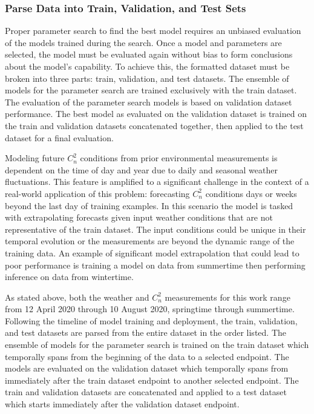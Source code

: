 \subsubsection{Parse Data into Train, Validation, and Test Sets}
Proper parameter search to find the best model requires an unbiased evaluation of the models trained during the search. Once a model and parameters are selected, the model must be evaluated again without bias to form conclusions about the model's capability. To achieve this, the formatted dataset must be broken into three parts: train, validation, and test datasets. The ensemble of models for the parameter search are trained exclusively with the train dataset. The evaluation of the parameter search models is based on validation dataset performance. The best model as evaluated on the validation dataset is trained on the train and validation datasets concatenated together, then applied to the test dataset for a final evaluation.

Modeling future $C_{n}^{2}$ conditions from prior environmental measurements is dependent on the time of day and year due to daily and seasonal weather fluctuations. This feature is amplified to a significant challenge in the context of a real-world application of this problem: forecasting $C_{n}^{2}$ conditions days or weeks beyond the last day of training examples. In this scenario the model is tasked with extrapolating forecasts given input weather conditions that are not representative of the train dataset. The input conditions could be unique in their temporal evolution or the measurements are beyond the dynamic range of the training data. An example of significant model extrapolation that could lead to poor performance is training a model on data from summertime then performing inference on data from wintertime.

As stated above, both the weather and $C_{n}^{2}$ measurements for this work range from 12 April 2020 through 10 August 2020, springtime through summertime. Following the timeline of model training and deployment, the train, validation, and test datasets are parsed from the entire dataset in the order listed. The ensemble of models for the parameter search is trained on the train dataset which temporally spans from the beginning of the data to a selected endpoint. The models are evaluated on the validation dataset which temporally spans from immediately after the train dataset endpoint to another selected endpoint. The train and validation datasets are concatenated and applied to a test dataset which starts immediately after the validation dataset endpoint.

